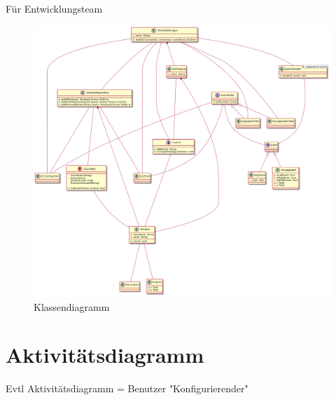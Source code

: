 \documentclass{article}
\begin{document}
\vfill

Für Entwicklungsteam

\begin{figure}[h]
	\centering
	\includegraphics[width=\textwidth]{class}
	\caption{Klassendiagramm}
\end{figure}

\vfill

\newpage

\section{Aktivitätsdiagramm}

\vfill

Evtl Aktivitätsdiagramm = Benutzer "Konfigurierender"
\end{document}
